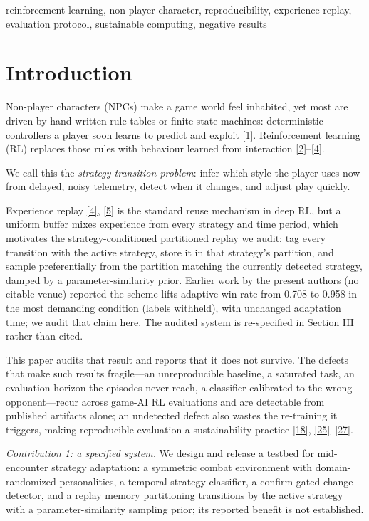 \documentclass[conference,9pt]{IEEEtran}
\begin{document}
\begin{IEEEkeywords}
reinforcement learning, non-player character, reproducibility, experience replay, evaluation protocol, sustainable computing, negative results
\end{IEEEkeywords}

\section{Introduction}

Non-player characters (NPCs) make a game world feel inhabited, yet most are driven by hand-written rule tables or finite-state machines: deterministic controllers a player soon learns to predict and exploit \hyperlink{cite.ref1}{[1]}. Reinforcement learning (RL) replaces those rules with behaviour learned from interaction \hyperlink{cite.ref2}{[2]}--\hyperlink{cite.ref4}{[4]}.

We call this the \textit{strategy-transition problem}: infer which style the player uses now from delayed, noisy telemetry, detect when it changes, and adjust play quickly.

Experience replay \hyperlink{cite.ref4}{[4]}, \hyperlink{cite.ref5}{[5]} is the standard reuse mechanism in deep RL, but a uniform buffer mixes experience from every strategy and time period, which motivates the strategy-conditioned partitioned replay we audit: tag every transition with the active strategy, store it in that strategy's partition, and sample preferentially from the partition matching the currently detected strategy, damped by a parameter-similarity prior. Earlier work by the present authors (no citable venue) reported the scheme lifts adaptive win rate from 0.708 to 0.958 in the most demanding condition (labels withheld), with unchanged adaptation time; we audit that claim here. The audited system is re-specified in Section III rather than cited.

This paper audits that result and reports that it does not survive. The defects that make such results fragile---an unreproducible baseline, a saturated task, an evaluation horizon the episodes never reach, a classifier calibrated to the wrong opponent---recur across game-AI RL evaluations and are detectable from published artifacts alone; an undetected defect also wastes the re-training it triggers, making reproducible evaluation a sustainability practice \hyperlink{cite.ref18}{[18]}, \hyperlink{cite.ref25}{[25]}--\hyperlink{cite.ref27}{[27]}.

\textit{Contribution 1: a specified system.} We design and release a testbed for mid-encounter strategy adaptation: a symmetric combat environment with domain-randomized personalities, a temporal strategy classifier, a confirm-gated change detector, and a replay memory partitioning transitions by the active strategy with a parameter-similarity sampling prior; its reported benefit is not established.
\end{document}
